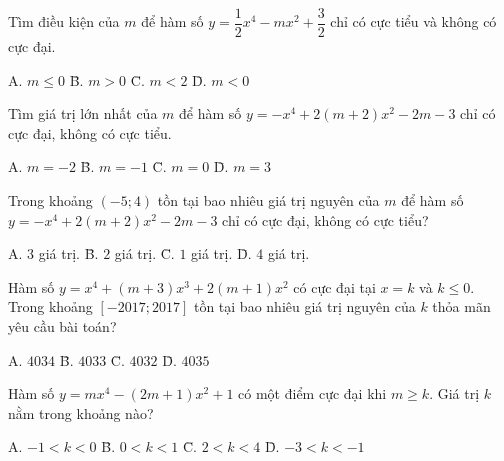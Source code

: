 \vspace{0.3cm}

 Tìm điều kiện của $m$ để hàm số $y = \dfrac{1}{2}x^4 - mx^2 + \dfrac{3}{2}$ chỉ có cực tiểu và không có cực đại.
\begin{tabbing}
A. $m \le 0$ \qquad\qquad\qquad \= B. $m > 0$ \qquad\qquad\qquad \= C. $m < 2$ \qquad\qquad\qquad \= D. $m < 0$
\end{tabbing}

\vspace{0.3cm}

 Tìm giá trị lớn nhất của $m$ để hàm số $y = -x^4 + 2(m+2)x^2 - 2m - 3$ chỉ có cực đại, không có cực tiểu.
\begin{tabbing}
A. $m = -2$ \qquad\qquad\quad \= B. $m = -1$ \qquad\qquad\quad \= C. $m = 0$ \qquad\qquad\qquad \= D. $m = 3$
\end{tabbing}

\vspace{0.3cm}

 Trong khoảng $(-5; 4)$ tồn tại bao nhiêu giá trị nguyên của $m$ để hàm số $y = -x^4 + 2(m+2)x^2 - 2m - 3$ chỉ có cực đại, không có cực tiểu?
\begin{tabbing}
A. $3$ giá trị. \qquad\qquad\quad \= B. $2$ giá trị. \qquad\qquad\quad \= C. $1$ giá trị. \qquad\qquad\quad \= D. $4$ giá trị.
\end{tabbing}

\vspace{0.3cm}

 Hàm số $y = x^4 + (m+3)x^3 + 2(m+1)x^2$ có cực đại tại $x = k$ và $k \le 0$. Trong khoảng $[-2017; 2017]$ tồn tại bao nhiêu giá trị nguyên của $k$ thỏa mãn yêu cầu bài toán?
\begin{tabbing}
A. $4034$ \qquad\qquad\qquad \= B. $4033$ \qquad\qquad\qquad \= C. $4032$ \qquad\qquad\qquad \= D. $4035$
\end{tabbing}

\vspace{0.3cm}

 Hàm số $y = mx^4 - (2m+1)x^2 + 1$ có một điểm cực đại khi $m \ge k$. Giá trị $k$ nằm trong khoảng nào?
\begin{tabbing}
A. $-1 < k < 0$ \qquad\qquad \= B. $0 < k < 1$ \qquad\qquad \= C. $2 < k < 4$ \qquad\qquad \= D. $-3 < k < -1$
\end{tabbing}

